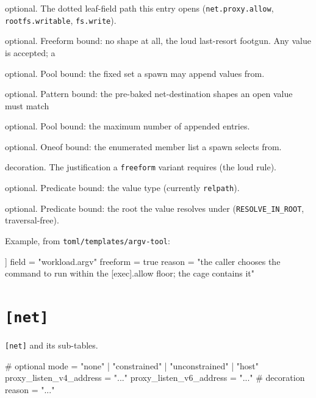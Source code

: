 \begin{description}
\tightlist
\item[\texttt{field}]
optional. The dotted leaf-field path this entry opens
(\texttt{net.proxy.allow}, \texttt{rootfs.writable}, \texttt{fs.write}).
\item[\texttt{freeform}]
optional. Freeform bound: no shape at all, the loud last-resort footgun.
Any value is accepted; a
\item[\texttt{from}]
optional. Pool bound: the fixed set a spawn may append values from.
\item[\texttt{match}]
optional. Pattern bound: the pre-baked net-destination shapes an open
value must match
\item[\texttt{max}]
optional. Pool bound: the maximum number of appended entries.
\item[\texttt{oneof}]
optional. Oneof bound: the enumerated member list a spawn selects from.
\item[\texttt{reason}]
decoration. The justification a \texttt{freeform} variant requires (the
loud rule).
\item[\texttt{type}]
optional. Predicate bound: the value type (currently \texttt{relpath}).
\item[\texttt{under}]
optional. Predicate bound: the root the value resolves under
(\texttt{RESOLVE\_IN\_ROOT}, traversal-free).
\end{description}

Example, from \texttt{toml/templates/argv-tool}:

\begin{kennelcode}
[[mutable]]
field = "workload.argv"
freeform = true
reason = "the caller chooses the command to run within the [exec].allow floor; the cage contains it"
\end{kennelcode}

\hypertarget{net}{%
\section{\texorpdfstring{\texttt{{[}net{]}}}{{[}net{]}}}\label{net}}

\texttt{{[}net{]}} and its sub-tables.

\begin{kennelcode}
[net]
# optional
mode     = "none" | "constrained" | "unconstrained" | "host"
proxy_listen_v4_address = "..."
proxy_listen_v6_address = "..."
# decoration
reason   = "..."
\end{kennelcode}

